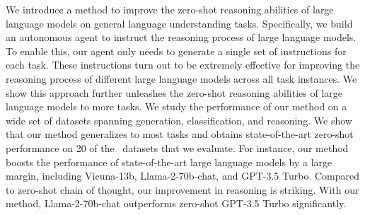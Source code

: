 We introduce a method to improve the zero-shot reasoning abilities of large language models on general language understanding tasks. Specifically, we build an autonomous agent to instruct the reasoning process of large language models. To enable this, our agent only needs to generate a single set of instructions for each task. These instructions turn out to be extremely effective for improving the reasoning process of different large language models across all task instances. We show this approach further unleashes the zero-shot reasoning abilities of large language models to more tasks. We study the performance of our method on a wide set of datasets spanning generation, classification, and reasoning. We show that our method generalizes to most tasks and obtains state-of-the-art zero-shot performance on 20 of the \NumDatasets\ datasets that we evaluate. For instance, our method boosts the performance of state-of-the-art large language models by a large margin, including Vicuna-13b, Llama-2-70b-chat, and GPT-3.5 Turbo. Compared to zero-shot chain of thought, our improvement in reasoning is striking. With our method, Llama-2-70b-chat outperforms zero-shot GPT-3.5 Turbo significantly. 